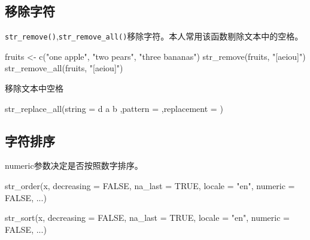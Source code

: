 \documentclass[
]{book}
\newenvironment{Shaded}{\begin{snugshade}}{\end{snugshade}}
\newcommand{\AttributeTok}[1]{\textcolor[rgb]{0.77,0.63,0.00}{#1}}
\newcommand{\ConstantTok}[1]{\textcolor[rgb]{0.00,0.00,0.00}{#1}}
\newcommand{\FunctionTok}[1]{\textcolor[rgb]{0.00,0.00,0.00}{#1}}
\newcommand{\NormalTok}[1]{#1}
\newcommand{\OtherTok}[1]{\textcolor[rgb]{0.56,0.35,0.01}{#1}}
\newcommand{\StringTok}[1]{\textcolor[rgb]{0.31,0.60,0.02}{#1}}
\begin{document}
\hypertarget{ux79fbux9664ux5b57ux7b26}{%
\subsection{移除字符}\label{ux79fbux9664ux5b57ux7b26}}

\texttt{str\_remove()},\texttt{str\_remove\_all()}移除字符。本人常用该函数剔除文本中的空格。

\begin{Shaded}
\begin{Highlighting}[]
\NormalTok{fruits }\OtherTok{\textless{}{-}} \FunctionTok{c}\NormalTok{(}\StringTok{"one apple"}\NormalTok{, }\StringTok{"two pears"}\NormalTok{, }\StringTok{"three bananas"}\NormalTok{)}
\FunctionTok{str\_remove}\NormalTok{(fruits, }\StringTok{"[aeiou]"}\NormalTok{)}
\FunctionTok{str\_remove\_all}\NormalTok{(fruits, }\StringTok{"[aeiou]"}\NormalTok{)}
\end{Highlighting}
\end{Shaded}

移除文本中空格

\begin{Shaded}
\begin{Highlighting}[]
\FunctionTok{str\_replace\_all}\NormalTok{(}\AttributeTok{string =} \StringTok{\textquotesingle{} d a  b \textquotesingle{}}\NormalTok{,}\AttributeTok{pattern =} \StringTok{\textquotesingle{} \textquotesingle{}}\NormalTok{,}\AttributeTok{replacement =} \StringTok{\textquotesingle{}\textquotesingle{}}\NormalTok{)}
\end{Highlighting}
\end{Shaded}

\hypertarget{ux5b57ux7b26ux6392ux5e8f}{%
\subsection{字符排序}\label{ux5b57ux7b26ux6392ux5e8f}}

numeric参数决定是否按照数字排序。

\begin{Shaded}
\begin{Highlighting}[]
\FunctionTok{str\_order}\NormalTok{(x, }\AttributeTok{decreasing =} \ConstantTok{FALSE}\NormalTok{, }\AttributeTok{na\_last =} \ConstantTok{TRUE}\NormalTok{, }\AttributeTok{locale =} \StringTok{"en"}\NormalTok{,}
  \AttributeTok{numeric =} \ConstantTok{FALSE}\NormalTok{, ...)}

\FunctionTok{str\_sort}\NormalTok{(x, }\AttributeTok{decreasing =} \ConstantTok{FALSE}\NormalTok{, }\AttributeTok{na\_last =} \ConstantTok{TRUE}\NormalTok{, }\AttributeTok{locale =} \StringTok{"en"}\NormalTok{,}
  \AttributeTok{numeric =} \ConstantTok{FALSE}\NormalTok{, ...)}
\end{Highlighting}
\end{Shaded}
\end{document}
